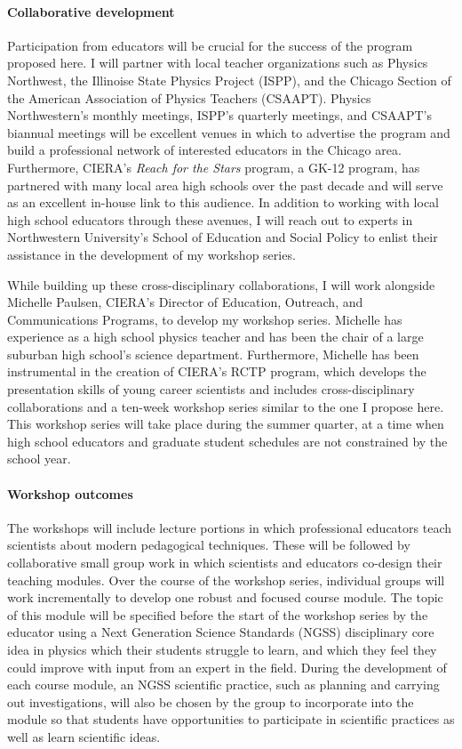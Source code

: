 \documentclass[11pt, preprint]{aastex}
\begin{document}
\vspace{-0.5cm}
\paragraph{Collaborative development}
\label{sct:development}
Participation from educators will be crucial for the success of the program proposed here.
I will partner with local teacher organizations such as Physics Northwest, the Illinoise State Physics Project (ISPP), and the Chicago Section of the American Association of Physics Teachers (CSAAPT).
Physics Northwestern's monthly meetings, ISPP's quarterly meetings, and CSAAPT's biannual meetings will be excellent venues in which to advertise the program and build a professional network of interested educators in the Chicago area.
Furthermore, CIERA's \emph{Reach for the Stars} program, a GK-12 program, has partnered with many local area high schools over the past decade and will serve as an excellent in-house link to this audience.
In addition to working with local high school educators through these avenues, I will reach out to experts in Northwestern University's School of Education and Social Policy to enlist their assistance in the development of my workshop series.

While building up these cross-disciplinary collaborations, I will work alongside Michelle Paulsen, CIERA's Director of Education, Outreach, and Communications Programs, to develop my workshop series.
Michelle has experience as a high school physics teacher and has been the chair of a large suburban high school's science department.
Furthermore, Michelle has been instrumental in the creation of CIERA's RCTP program, which develops the presentation skills of young career scientists and includes cross-disciplinary collaborations and a ten-week workshop series similar to the one I propose here.
This workshop series will take place during the summer quarter, at a time when high school educators and graduate student schedules are not constrained by the school year.

\vspace{-0.5cm}
\paragraph{Workshop outcomes} 
The workshops will include lecture portions in which professional educators teach scientists about modern pedagogical techniques.
These will be followed by collaborative small group work in which scientists and educators co-design their teaching modules.
Over the course of the workshop series, individual groups will work incrementally to develop one robust and focused course module.
The topic of this module will be specified before the start of the workshop series by the educator using a Next Generation Science Standards (NGSS) disciplinary core idea in physics which their students struggle to learn, and which they feel they could improve with input from an expert in the field.
During the development of each course module, an NGSS scientific practice, such as planning and carrying out investigations, will also be chosen by the group to incorporate into the module so that students have opportunities to participate in scientific practices as well as learn scientific ideas.
\end{document}

